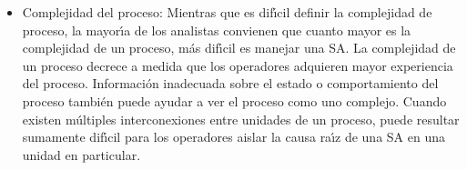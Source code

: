 \begin{itemize}
    depende de la naturaleza de los materiales que est{\'a}n siendo procesados. Una clasificaci{\'o}n preliminar de
    materiales manejados puede ser la siguiente: \textit{qu{\'\i}micos peligrosos vs no peligrosos},
    \textit{estado de los qu{\'\i}micos (s{\'o}lido/l{\'\i}quido/gaseoso)} y \textit{sustancias inflamables vs
    no inflamables}. Las acciones correctivas a ser tomadas en caso de situaciones anormales involucrando
    diferentes tipos de materiales pueden ser diferentes, ya sea en t{\'e}rminos de tiempo de respuesta como en
    procedimientos.
    \item Complejidad del proceso: Mientras que es dif{\'\i}cil definir la complejidad de proceso, la mayor{\'\i}a de
    los analistas convienen que cuanto mayor es la complejidad de un proceso, m{\'a}s dif{\'\i}cil es
    manejar una SA. La complejidad de un proceso decrece a medida que los operadores adquieren mayor
    experiencia del proceso. Informaci{\'o}n inadecuada sobre el estado o comportamiento del proceso tambi{\'e}n
    puede ayudar a ver el proceso como uno complejo. Cuando existen m{\'u}ltiples interconexiones entre unidades
    de un proceso, puede resultar sumamente dif{\'\i}cil para los operadores aislar la causa ra{\'\i}z de una SA en
    una unidad en particular.
\end{itemize}

